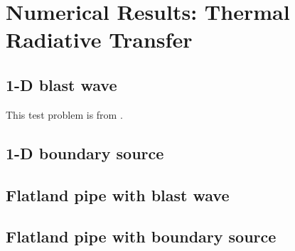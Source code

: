 
\chapter{Numerical Results: Thermal Radiative Transfer}


\section{1-D blast wave}
This test problem is from \cite{Rau2005,Ols2007}.

\section{1-D boundary source}

\section{Flatland pipe with blast wave}

\section{Flatland pipe with boundary source}


